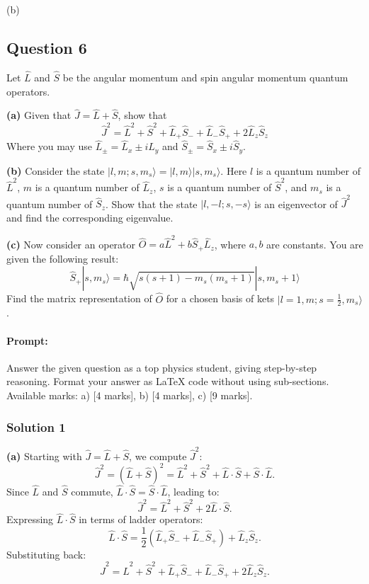 \documentclass{article}
\begin{document}
(b) 


\subsection{Question 6}

Let \(\hat{L}\) and \(\hat{S}\) be the angular momentum and spin angular momentum quantum operators.

\textbf{(a)} Given that \(\hat{J} = \hat{L} + \hat{S}\), show that
\[
\hat{J}^2 = \hat{L}^2 + \hat{S}^2 + \hat{L}_+ \hat{S}_- + \hat{L}_- \hat{S}_+ + 2 \hat{L}_z \hat{S}_z
\]
Where you may use \(\hat{L}_\pm = \hat{L}_x \pm i \hat{L}_y\) and \(\hat{S}_\pm = \hat{S}_x \pm i \hat{S}_y\).

\textbf{(b)} Consider the state \(|l, m; s, m_s\rangle = |l, m\rangle |s, m_s\rangle\). Here \(l\) is a quantum number of \(\hat{L}^2\), \(m\) is a quantum number of \(\hat{L}_z\), \(s\) is a quantum number of \(\hat{S}^2\), and \(m_s\) is a quantum number of \(\hat{S}_z\). Show that the state \(|l, -l; s, -s\rangle\) is an eigenvector of \(\hat{J}^2\) and find the corresponding eigenvalue.

\textbf{(c)} Now consider an operator \(\hat{O} = a \hat{L}^2 + b \hat{S}_+ \hat{L}_z\), where \(a, b\) are constants. You are given the following result:
\[
\hat{S}_+ |s, m_s\rangle = \hbar \sqrt{s(s+1) - m_s(m_s + 1)} |s, m_s + 1\rangle
\]
Find the matrix representation of \(\hat{O}\) for a chosen basis of kets \(|l = 1, m; s = \frac{1}{2}, m_s\rangle\).

\paragraph{Prompt: \\} 
Answer the given question as a top physics student, giving step-by-step reasoning. Format your answer as LaTeX code without using sub-sections. Available marks: a) [4 marks], b) [4 marks], c) [9 marks].


\subsubsection{Solution 1}
\textbf{(a)} Starting with \(\hat{J} = \hat{L} + \hat{S}\), we compute \(\hat{J}^2\):
\[
\hat{J}^2 = (\hat{L} + \hat{S})^2 = \hat{L}^2 + \hat{S}^2 + \hat{L} \cdot \hat{S} + \hat{S} \cdot \hat{L}.
\]
Since \(\hat{L}\) and \(\hat{S}\) commute, \(\hat{L} \cdot \hat{S} = \hat{S} \cdot \hat{L}\), leading to:
\[
\hat{J}^2 = \hat{L}^2 + \hat{S}^2 + 2\hat{L} \cdot \hat{S}.
\]
Expressing \(\hat{L} \cdot \hat{S}\) in terms of ladder operators:
\[
\hat{L} \cdot \hat{S} = \frac{1}{2}(\hat{L}_+ \hat{S}_- + \hat{L}_- \hat{S}_+) + \hat{L}_z \hat{S}_z.
\]
Substituting back:
\[
\hat{J}^2 = \hat{L}^2 + \hat{S}^2 + \hat{L}_+ \hat{S}_- + \hat{L}_- \hat{S}_+ + 2\hat{L}_z \hat{S}_z.
\]
\end{document}
